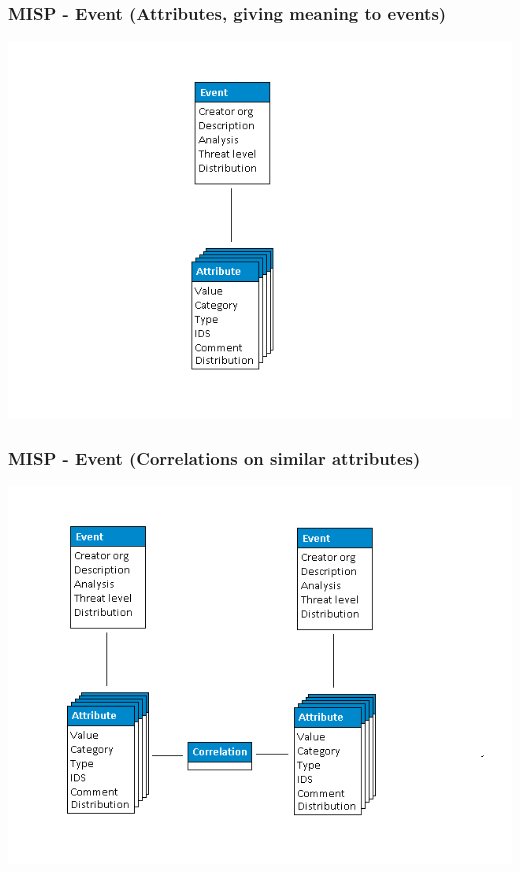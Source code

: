 \begin{frame}
    \frametitle{MISP - Event (Attributes, giving meaning to events)}
    \includegraphics[scale=0.45]{screenshots/datamodel2.png}
\end{frame}

\begin{frame}
    \frametitle{MISP - Event (Correlations on similar attributes)}
    \includegraphics[scale=0.45]{screenshots/datamodel3.png}
\end{frame}

